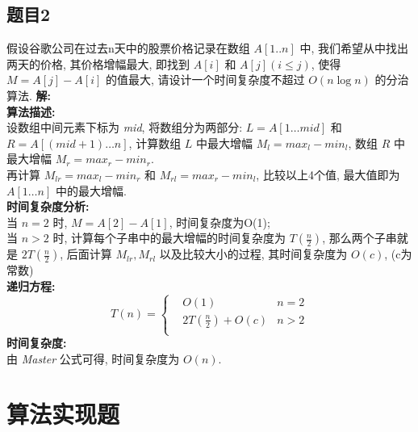 \documentclass[a4paper]{ctexart}
\begin{document}
\begin{sloppypar}
    \subsection*{题目2}
    假设谷歌公司在过去n天中的股票价格记录在数组 $A[1..n]$ 中,
    我们希望从中找出两天的价格, 其价格增幅最大,
    即找到 $A[i]$ 和 $A[j] (i \leq j)$,
    使得 $M = A[j] - A[i]$ 的值最大,
    请设计一个时间复杂度不超过 $O(n \log n)$ 的分治算法.
    \textbf{解:} \\
    \textbf{算法描述:} \\
    设数组中间元素下标为 \emph{mid}, 将数组分为两部分:
    $L = A[1 \dots mid]$ 和 $R = A[(mid+1) \dots n]$,
    计算数组 $L$ 中最大增幅 $M_l = max_l - min_l$,
    数组 $R$ 中最大增幅 $M_r = max_r - min_r$. \\
    再计算 $M_{lr} = max_l - min_r$ 和
    $M_{rl} = max_r - min_l$,
    比较以上4个值, 最大值即为 $A[1 \dots n]$ 中的最大增幅. \\
    \textbf{时间复杂度分析:} \\
    当 $n = 2$ 时, $M = A[2] - A[1]$, 时间复杂度为O(1); \\
    当 $n > 2$ 时, 计算每个子串中的最大增幅的时间复杂度为 $T(\frac{n}{2})$,
    那么两个子串就是 $2T(\frac{n}{2})$,
    后面计算 $M_{lr}, M_{rl}$ 以及比较大小的过程,
    其时间复杂度为 $O(c)$, (c为常数) \\
    \textbf{递归方程:} \\
    \begin{equation}
        T(n) =
        \left\{
        \begin{aligned}
            \nonumber
             & O(1)                   & n = 2 \\
             & 2T(\frac{n}{2}) + O(c) & n > 2 \\
        \end{aligned}
        \right.
    \end{equation}
    \textbf{时间复杂度:} \\
    由 \emph{Master} 公式可得, 时间复杂度为 $O(n)$.
    \vspace{1em}

    \section*{算法实现题}

\end{sloppypar}
\end{document}

